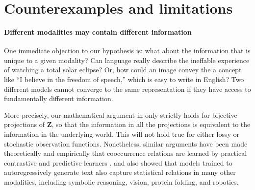 \documentclass{article}
\theoremstyle{plain}
\theoremstyle{definition}
\theoremstyle{remark}
\begin{document}
\section{Counterexamples and limitations}\label{sec:limitations}


\paragraph{Different modalities may contain different information}

One immediate objection to our hypothesis is: what about the information that is unique to a given modality? Can language really describe the ineffable experience of watching a total solar eclipse? Or, how could an image convey the a concept like ``I believe in the freedom of speech,'' which is easy to write in English? Two different models cannot converge to the same representation if they have access to fundamentally different information. 

More precisely, our mathematical argument in  only strictly holds for bijective projections of $\mathbf{Z}$, so that the information in all the projections is equivalent to the information in the underlying world. This will not hold true for either lossy or stochastic observation functions. Nonetheless, similar arguments have been made theoretically and empirically that cooccurrence relations are learned by practical contrastive \citep{tongzhouw2020hypersphere,zimmermann2021contrastive} and predictive learners \citep{papyan2020prevalence,roeder2021linear}.  
\citet{lu2021pretrained} and \citet{mirchandani2023large} also showed that models trained to autoregressively generate text also capture statistical relations in many other modalities, including symbolic reasoning, 
vision, protein folding, and robotics.
\end{document}
